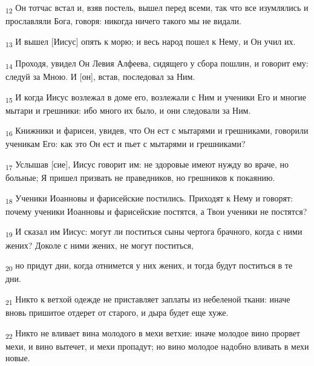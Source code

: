 \begin{tcolorbox}
\textsubscript{12} Он тотчас встал и, взяв постель, вышел перед всеми, так что все изумлялись и прославляли Бога, говоря: никогда ничего такого мы не видали.
\end{tcolorbox}
\begin{tcolorbox}
\textsubscript{13} И вышел [Иисус] опять к морю; и весь народ пошел к Нему, и Он учил их.
\end{tcolorbox}
\begin{tcolorbox}
\textsubscript{14} Проходя, увидел Он Левия Алфеева, сидящего у сбора пошлин, и говорит ему: следуй за Мною. И [он], встав, последовал за Ним.
\end{tcolorbox}
\begin{tcolorbox}
\textsubscript{15} И когда Иисус возлежал в доме его, возлежали с Ним и ученики Его и многие мытари и грешники: ибо много их было, и они следовали за Ним.
\end{tcolorbox}
\begin{tcolorbox}
\textsubscript{16} Книжники и фарисеи, увидев, что Он ест с мытарями и грешниками, говорили ученикам Его: как это Он ест и пьет с мытарями и грешниками?
\end{tcolorbox}
\begin{tcolorbox}
\textsubscript{17} Услышав [сие], Иисус говорит им: не здоровые имеют нужду во враче, но больные; Я пришел призвать не праведников, но грешников к покаянию.
\end{tcolorbox}
\begin{tcolorbox}
\textsubscript{18} Ученики Иоанновы и фарисейские постились. Приходят к Нему и говорят: почему ученики Иоанновы и фарисейские постятся, а Твои ученики не постятся?
\end{tcolorbox}
\begin{tcolorbox}
\textsubscript{19} И сказал им Иисус: могут ли поститься сыны чертога брачного, когда с ними жених? Доколе с ними жених, не могут поститься,
\end{tcolorbox}
\begin{tcolorbox}
\textsubscript{20} но придут дни, когда отнимется у них жених, и тогда будут поститься в те дни.
\end{tcolorbox}
\begin{tcolorbox}
\textsubscript{21} Никто к ветхой одежде не приставляет заплаты из небеленой ткани: иначе вновь пришитое отдерет от старого, и дыра будет еще хуже.
\end{tcolorbox}
\begin{tcolorbox}
\textsubscript{22} Никто не вливает вина молодого в мехи ветхие: иначе молодое вино прорвет мехи, и вино вытечет, и мехи пропадут; но вино молодое надобно вливать в мехи новые.
\end{tcolorbox}
